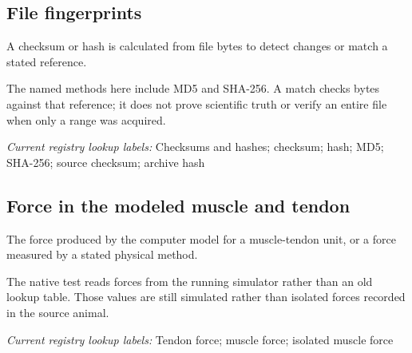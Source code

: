 \begin{samepage}
\subsection*{File fingerprints}
\noindent A checksum or hash is calculated from file bytes to detect changes or match a stated reference.\par
\end{samepage}
\begin{samepage}
\noindent The named methods here include MD5 and SHA-256. A match checks bytes against that reference; it does not prove scientific truth or verify an entire file when only a range was acquired.\par\nopagebreak[4]

\end{samepage}


\noindent\textit{Current registry lookup labels:} Checksums and hashes; checksum; hash; MD5; SHA-256; source checksum; archive hash\par

\begin{samepage}
\subsection*{Force in the modeled muscle and tendon}
\noindent The force produced by the computer model for a muscle-tendon unit, or a force measured by a stated physical method.\par
\end{samepage}
\begin{samepage}
\noindent The native test reads forces from the running simulator rather than an old lookup table. Those values are still simulated rather than isolated forces recorded in the source animal.\par\nopagebreak[4]

\end{samepage}


\noindent\textit{Current registry lookup labels:} Tendon force; muscle force; isolated muscle force\par

